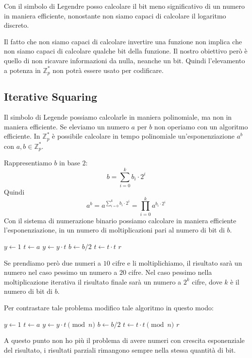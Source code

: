 Con il simbolo di Legendre posso calcolare il bit meno significativo di un numero
in maniera efficiente, nonostante non siamo capaci di calcolare il logaritmo 
discreto.

Il fatto che non siamo capaci di calcolare invertire una funzione non implica che 
non siamo capaci di calcolare qualche bit della funzione. Il nostro obiettivo 
però è quello di non ricavare informazioni da nulla, neanche un bit.
Quindi l'elevamento a potenza in $\mathbb{Z}_p^*$ non 
potrà essere usato per codificare.
\subsection{Iterative Squaring}
Il simbolo di Legende possiamo calcolarle in maniera polinomiale, ma 
non in maniera efficiente.
Se eleviamo un numero $a$ per $b$ non operiamo con un algoritmo efficiente.
In  $\mathbb{Z}_p^*$ è possibile calcolare in tempo polinomiale
un'esponenziazione $a^b$ con $a,b \in \mathbb{Z}_p^*$.

Rappresentiamo $b$ in base $2$:
\[
  b = \sum_{i=0}^k b_i \cdot 2^i
\]
Quindi 
\[
  a^b = a^{\sum_{i=0}^k b_i \cdot 2^i} = \prod_{i=0}^k a^{b_i \cdot 2^i}
\]
Con il sistema di numerazione binario possiamo calcolare in maniera efficiente
l'esponenziazione, in un numero di moltiplicazioni pari al numero di bit di $b$.
\begin{algorithmic}[1]
    \State $y \gets 1$
    \State $t \gets a$
        \State $y \gets y \cdot t$
      \EndIf
      \State $b \gets b / 2$
      \State $t \gets t \cdot t$
    \EndWhile
    \State \Return $r$
  \EndProcedure
\end{algorithmic}
Se prendiamo però due numeri a $10$ cifre e li moltiplichiamo, il risultato
sarà un numero nel caso pessimo un numero a $20$ cifre.
Nel caso pessimo nella moltiplicazione iterativa il risultato finale 
sarà un numero a $2^k$ cifre, dove $k$ è il numero di bit di $b$.

Per contrastare tale problema modifico tale algoritmo in questo modo:
\begin{algorithmic}[1]
    \State $y \gets 1$
    \State $t \gets a$
        \State $y \gets y \cdot t \pmod n$
      \EndIf
      \State $b \gets b / 2$
      \State $t \gets t \cdot t \pmod n$
    \EndWhile
    \State \Return $r$
  \EndProcedure
\end{algorithmic}
A questo punto non ho più il problema di avere numeri con 
crescita esponenziale del risultato, i risultati parziali rimangono 
sempre nella stessa quantità di bit.

